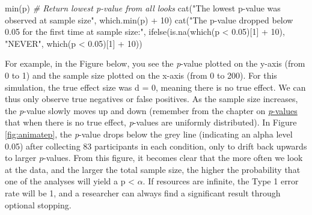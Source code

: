 \documentclass[
  oneside]{krantz}
\makeatletter
\newenvironment{Shaded}{\begin{snugshade}}{\end{snugshade}}
\newcommand{\CommentTok}[1]{\textcolor[rgb]{0.37,0.37,0.37}{\textit{#1}}}
\newcommand{\DecValTok}[1]{\textcolor[rgb]{0.06,0.06,0.06}{#1}}
\newcommand{\FloatTok}[1]{\textcolor[rgb]{0.06,0.06,0.06}{#1}}
\newcommand{\FunctionTok}[1]{\textcolor[rgb]{0,0,0}{#1}}
\newcommand{\NormalTok}[1]{#1}
\newcommand{\SpecialCharTok}[1]{\textcolor[rgb]{0,0,0}{#1}}
\newcommand{\StringTok}[1]{\textcolor[rgb]{0.5,0.5,0.5}{#1}}
\newenvironment{kframe}{%
\medskip{}
\setlength{\fboxsep}{.8em}
 \def\at@end@of@kframe{}%
 \ifinner\ifhmode%
  \def\at@end@of@kframe{\end{minipage}}%
  \begin{minipage}{\columnwidth}%
 \fi\fi%
 \def\FrameCommand##1{\hskip\@totalleftmargin \hskip-\fboxsep
 \colorbox{shadecolor}{##1}\hskip-\fboxsep
     \hskip-\linewidth \hskip-\@totalleftmargin \hskip\columnwidth}%
 \MakeFramed {\advance\hsize-\width
   \@totalleftmargin\z@ \linewidth\hsize
   \@setminipage}}%
 {\par\unskip\endMakeFramed%
 \at@end@of@kframe}
\renewenvironment{Shaded}{\begin{kframe}}{\end{kframe}}
\makeatother
\begin{document}
\begin{Shaded}
\begin{Highlighting}[]
\FunctionTok{min}\NormalTok{(p) }\CommentTok{\# Return lowest p{-}value from all looks}
\FunctionTok{cat}\NormalTok{(}\StringTok{"The lowest p{-}value was observed at sample size"}\NormalTok{, }\FunctionTok{which.min}\NormalTok{(p) }\SpecialCharTok{+} \DecValTok{10}\NormalTok{) }
\FunctionTok{cat}\NormalTok{(}\StringTok{"The p{-}value dropped below 0.05 for the first time at sample size:"}\NormalTok{, }
    \FunctionTok{ifelse}\NormalTok{(}\FunctionTok{is.na}\NormalTok{(}\FunctionTok{which}\NormalTok{(p }\SpecialCharTok{\textless{}} \FloatTok{0.05}\NormalTok{)[}\DecValTok{1}\NormalTok{] }\SpecialCharTok{+} \DecValTok{10}\NormalTok{), }\StringTok{"NEVER"}\NormalTok{, }\FunctionTok{which}\NormalTok{(p }\SpecialCharTok{\textless{}} \FloatTok{0.05}\NormalTok{)[}\DecValTok{1}\NormalTok{] }\SpecialCharTok{+} \DecValTok{10}\NormalTok{)) }
\end{Highlighting}
\end{Shaded}

For example, in the Figure below, you see the \emph{p}-value plotted on the y-axis (from 0 to 1) and the sample size plotted on the x-axis (from 0 to 200). For this simulation, the true effect size was d = 0, meaning there is no true effect. We can thus only observe true negatives or false positives. As the sample size increases, the \emph{p}-value slowly moves up and down (remember from the chapter on \protect\hyperlink{pvalues}{\emph{p}-values} that when there is no true effect, \emph{p}-values are uniformly distributed). In Figure \ref{fig:animatep}, the \emph{p}-value drops below the grey line (indicating an alpha level 0.05) after collecting 83 participants in each condition, only to drift back upwards to larger \emph{p}-values. From this figure, it becomes clear that the more often we look at the data, and the larger the total sample size, the higher the probability that one of the analyses will yield a p \textless{} \(\alpha\). If resources are infinite, the Type 1 error rate will be 1, and a researcher can always find a significant result through optional stopping.
\end{document}
